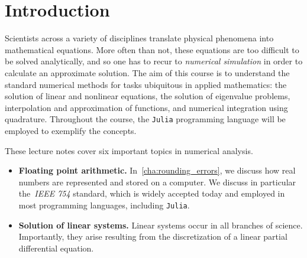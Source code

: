 \chapter*{Introduction}%
Scientists across a variety of disciplines translate physical phenomena into mathematical equations.
More often than not,
these equations are too difficult to be solved analytically,
and so one has to recur to \emph{numerical simulation} in order to calculate an approximate solution.
The aim of this course is to understand the standard numerical methods for tasks ubiquitous in applied mathematics:
the solution of linear and nonlinear equations, 
the solution of eigenvalue problems,
interpolation and approximation of functions,
and numerical integration using quadrature.
Throughout the course, the \texttt{Julia} programming language will be employed to exemplify the concepts.

These lecture notes cover six important topics in numerical analysis.

\begin{itemize}
    \item
        \textbf{Floating point arithmetic.}
        In~\cref{cha:rounding_errors},
        we discuss how real numbers are represented and stored on a computer.
        We discuss in particular the~\emph{IEEE 754} standard, which is widely accepted today
        and employed in most programming languages, including \texttt{Julia}.

    \item
        \textbf{Solution of linear systems.}
        Linear systems occur in all branches of science.
        Importantly, they arise resulting from the discretization of a linear partial differential equation.
\end{itemize}
